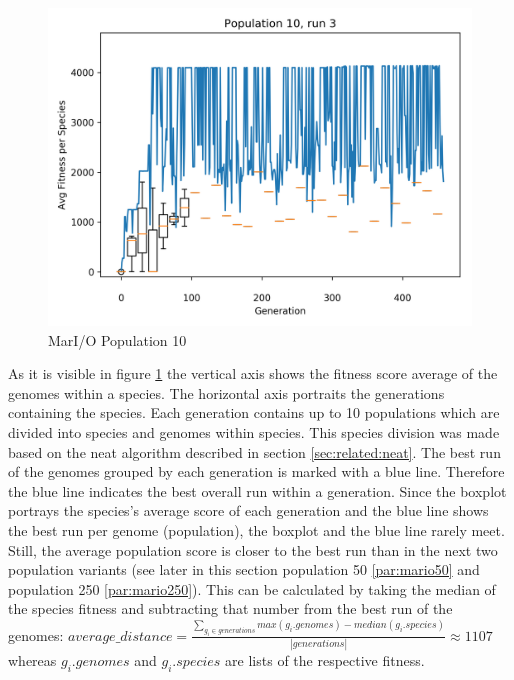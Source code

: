 \begin{figure}[h]
\begin{minipage}{0.33\textwidth}
				\end{minipage}
				\begin{minipage}{0.33\textwidth}
					\centering
					\includegraphics[width=1\textwidth]{graphics/mario/pop10_run3} %
				\end{minipage}
				\caption{MarI/O Population 10}
				\label{fig:mario10}
			\end{figure}
			As it is visible in figure \ref{fig:mario10} the vertical axis shows the fitness score average of the genomes within a species. The horizontal axis portraits the generations containing the species. Each generation contains up to 10 populations which are divided into species and genomes within species. This species division was made based on the \gls{neat} algorithm described in section \ref{sec:related:neat}. The best run of the genomes grouped by each generation is marked with a blue line. Therefore the blue line indicates the best overall run within a generation. Since the boxplot portrays the species's average score of each generation and the blue line shows the best run per genome (population), the boxplot and the blue line rarely meet. Still, the average population score is closer to the best run than in the next two population variants (see later in this section population 50 \ref{par:mario50} and population 250 \ref{par:mario250}). This can be calculated by taking the median of the species fitness and subtracting that number from the best run of the genomes:
			$average\_distance = \frac{\sum\nolimits_{g_i \in generations} max(g_i.genomes) - median(g_i.species)}{|generations|}\approx1107$ whereas $g_i.genomes$ and $g_i.species$ are lists of the respective fitness. \\
